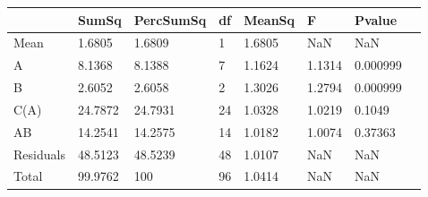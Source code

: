 \begin{table} 
\begin{tabular}{llllllll}
 & SumSq & PercSumSq & df & MeanSq & F & Pvalue \\ 
 \hline 
Mean & 1.6805 & 1.6809 & 1 & 1.6805 & NaN & NaN \\ 
A & 8.1368 & 8.1388 & 7 & 1.1624 & 1.1314 & 0.000999 \\ 
B & 2.6052 & 2.6058 & 2 & 1.3026 & 1.2794 & 0.000999 \\ 
C(A) & 24.7872 & 24.7931 & 24 & 1.0328 & 1.0219 & 0.1049 \\ 
AB & 14.2541 & 14.2575 & 14 & 1.0182 & 1.0074 & 0.37363 \\ 
Residuals & 48.5123 & 48.5239 & 48 & 1.0107 & NaN & NaN \\ 
Total & 99.9762 & 100 & 96 & 1.0414 & NaN & NaN \\ 
\end{tabular} 
\end{table} 
